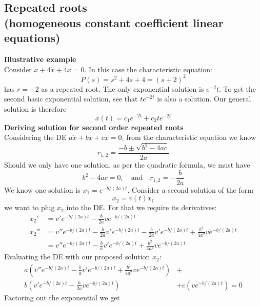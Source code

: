 \documentclass{report}
\begin{document}
\subsection{Repeated roots\\(homogeneous constant coefficient linear equations)}
\textbf{Illustrative example}\\
Consider $\ddot{x}+4\dot{x}+4x=0$. In this case the
characteristic equation:
\begin{equation*}
P(s)=s^2+4s+4=(s+2)^2
\end{equation*}
has $r=-2$ as a repeated root. The only exponential solution is $e^{-2}t$. 
To get the second basic exponential solution, see that
$te^{-2t}$ is also a solution. Our general solution is 
therefore
\begin{equation*}
x(t)=c_1e^{-2t}+c_2te^{-2t}
\end{equation*}
\textbf{Deriving solution for second order repeated roots}\\
Considering the DE $a\ddot{x}+b\dot{x}+cx=0$, from the characteristic equation we know
\begin{equation*}
r_{1,2}=\frac{-b\pm\sqrt{b^2-4ac}}{2a}
\end{equation*}
Should we only have one solution, as per the quadratic formula, we must have
\begin{equation*}
b^2-4ac=0,\quad\text{and}\quad r_{1,2}=-\frac{b}{2a}
\end{equation*}
We know one solution is $x_1=e^{-b/(2a)t}$. Consider a second solution of the form 
\begin{equation*}
x_2=v(t)x_1
\end{equation*}
we want to plug $x_2$ into the DE. For that we require its derivatives:
\begin{align*}
x_2'&=v'e^{-b/(2a)t}-\frac{b}{2a}ve^{-b/(2a)t}\\
x_2''&=v''e^{-b/(2a)t}-\frac{b}{2a}v'e^{-b/(2a)t}
-\frac{b}{2a}v'e^{-b/(2a)t}+\frac{b^2}{4a^2}ve^{-b/(2a)t}
\\&=v''e^{-b/(2a)t}-\frac{b}{a}v'e^{-b/(2a)t}+\frac{b^2}{4a^2}ve^{-b/(2a)t}
\end{align*}
Evaluating the DE with our proposed solution $x_2$:
\begin{align*}
a\left(v''e^{-b/(2a)t}-\frac{b}{a}v'e^{-b/(2a)t}+\frac{b^2}{4a^2}ve^{-b/(2a)t}\right)&+\\
b\left(v'e^{-b/(2a)t}-\frac{b}{2a}ve^{-b/(2a)t}\right)
&+c\left(ve^{-b/(2a)t}\right)=0
\end{align*}
Factoring out the exponential we get
\end{document}
